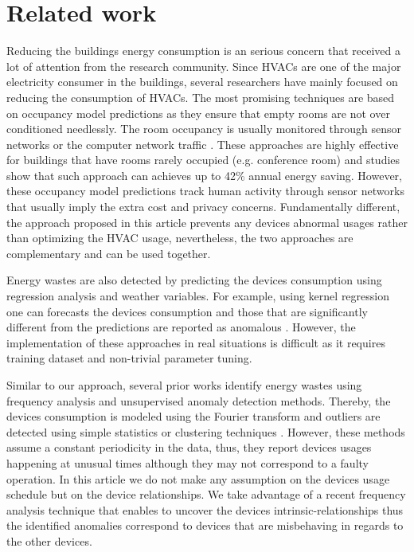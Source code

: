\section{Related work}
Reducing the buildings energy consumption is an serious concern that received a lot of attention from the research community.
Since HVACs are one of the major electricity consumer in the buildings, several researchers have mainly focused on reducing the consumption of HVACs.
The most promising techniques are based on occupancy model predictions as they ensure that empty rooms are not over conditioned needlessly.
The room occupancy is usually monitored through sensor networks \cite{agarwal:ipsn2011,erickson:ipsn2011} or the computer network traffic \cite{kim:buildsys2010}.
These approaches are highly effective for buildings that have rooms rarely occupied (e.g. conference room) and studies show that such approach can achieves up to 42\% annual energy saving.
However, these occupancy model predictions track human activity through sensor networks that usually imply the extra cost and privacy concerns.
Fundamentally different, the approach proposed in this article prevents any devices abnormal usages rather than optimizing the HVAC usage, nevertheless, the two approaches are complementary and can be used together.

Energy wastes are also detected by predicting the devices consumption using regression analysis and weather variables.
For example, using kernel regression one can forecasts the devices consumption and those that are significantly different from the predictions are reported as anomalous \cite{brown:buildperf2012}.
However, the implementation of these approaches in real situations is difficult as it requires training dataset and non-trivial parameter tuning.

Similar to our approach, several prior works identify energy wastes using frequency analysis and unsupervised anomaly detection methods.
Thereby, the devices consumption is modeled using the Fourier transform and outliers are detected using simple statistics \cite{li:ieee2010} or clustering techniques \cite{Bellala_buildsys11,wrinch:pes2012,jakkula,chen:aaaiw2011}.
However, these methods assume a constant periodicity in the data, thus, they report devices usages happening at unusual times although they may not correspond to a faulty operation.
In this article we do not make any assumption on the devices usage schedule but on the device relationships.
We take advantage of a recent frequency analysis technique that enables to uncover the devices intrinsic-relationships \cite{romain:iotapp12} thus the identified anomalies correspond to devices that are misbehaving in regards to the other devices.

